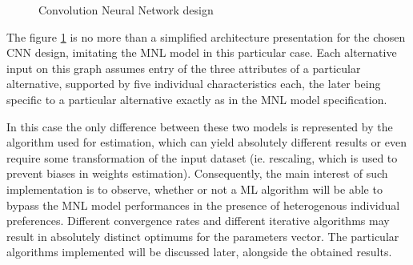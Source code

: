 \documentclass[12pt,]{article}
\begin{document}
\begin{figure}[!htbp] \centering 
 \caption{Convolution Neural Network design} 
 \label{fig:cnn} 
\end{figure}

The figure \ref{fig:cnn} is no more than a simplified architecture
presentation for the chosen CNN design, imitating the MNL model in this
particular case. Each alternative input on this graph assumes entry of
the three attributes of a particular alternative, supported by five
individual characteristics each, the later being specific to a
particular alternative exactly as in the MNL model specification.

In this case the only difference between these two models is represented
by the algorithm used for estimation, which can yield absolutely
different results or even require some transformation of the input
dataset (ie. rescaling, which is used to prevent biases in weights
estimation). Consequently, the main interest of such implementation is
to observe, whether or not a ML algorithm will be able to bypass the MNL
model performances in the presence of heterogenous individual
preferences. Different convergence rates and different iterative
algorithms may result in absolutely distinct optimums for the parameters
vector. The particular algorithms implemented will be discussed later,
alongside the obtained results.
\end{document}

